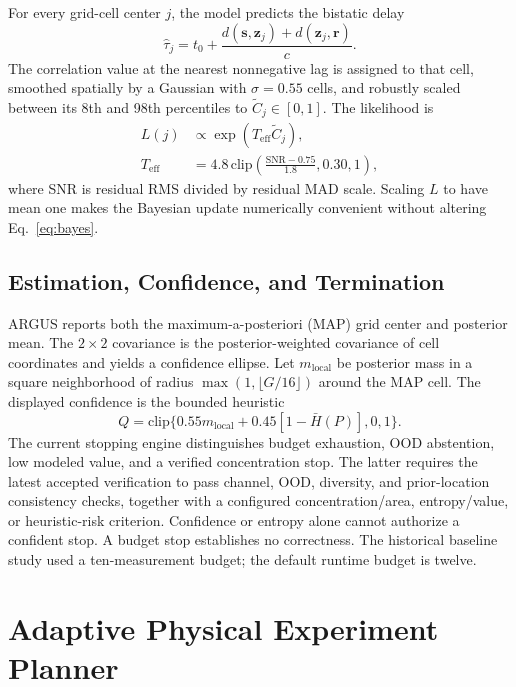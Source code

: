\documentclass[conference]{IEEEtran}
\newcommand{\vect}[1]{\boldsymbol{#1}}
\newcommand{\Hn}{\bar{H}}
\begin{document}
For every grid-cell center $j$, the model predicts the bistatic delay
\begin{equation}
 \hat\tau_j=t_0+\frac{d(\vect{s},\vect{z}_j)+d(\vect{z}_j,\vect{r})}{c}.
 \label{eq:bistatic}
\end{equation}
The correlation value at the nearest nonnegative lag is assigned to that cell, smoothed spatially by a Gaussian with $\sigma=0.55$ cells, and robustly scaled between its 8th and 98th percentiles to $\tilde C_j\in[0,1]$. The likelihood is
\begin{align}
 L(j)&\propto \exp(T_{\mathrm{eff}}\tilde C_j),\\
 T_{\mathrm{eff}}&=4.8\,\mathrm{clip}\!\left(
 \frac{\mathrm{SNR}-0.75}{1.8},0.30,1\right),
 \label{eq:likelihood}
\end{align}
where SNR is residual RMS divided by residual MAD scale. Scaling $L$ to have mean one makes the Bayesian update numerically convenient without altering Eq.~\eqref{eq:bayes}.

\subsection{Estimation, Confidence, and Termination}
ARGUS reports both the maximum-a-posteriori (MAP) grid center and posterior mean. The $2\times2$ covariance is the posterior-weighted covariance of cell coordinates and yields a confidence ellipse. Let $m_{\mathrm{local}}$ be posterior mass in a square neighborhood of radius $\max(1,\lfloor G/16\rfloor)$ around the MAP cell. The displayed confidence is the bounded heuristic
\begin{equation}
 Q=\mathrm{clip}\{0.55m_{\mathrm{local}}+0.45[1-\Hn(P)],0,1\}.
 \label{eq:confidence}
\end{equation}
The current stopping engine distinguishes budget exhaustion, OOD abstention, low modeled value, and a verified concentration stop. The latter requires the latest accepted verification to pass channel, OOD, diversity, and prior-location consistency checks, together with a configured concentration/area, entropy/value, or heuristic-risk criterion. Confidence or entropy alone cannot authorize a confident stop. A budget stop establishes no correctness. The historical baseline study used a ten-measurement budget; the default runtime budget is twelve.

\section{Adaptive Physical Experiment Planner}
\end{document}
